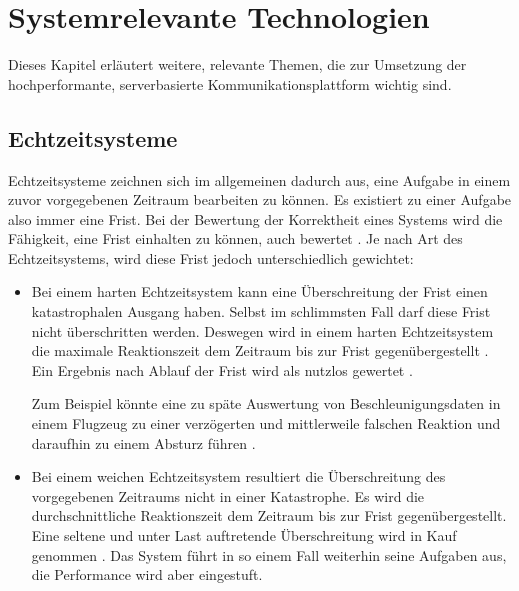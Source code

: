 
\chapter{Systemrelevante Technologien}
\label{com_plattform}

Dieses Kapitel erläutert weitere, relevante Themen, die zur Umsetzung der hochperformante, serverbasierte Kommunikationsplattform wichtig sind.

\section{Echtzeitsysteme}
\label{real_time_systems}
Echtzeitsysteme zeichnen sich im allgemeinen dadurch aus, eine Aufgabe in einem zuvor vorgegebenen Zeitraum bearbeiten zu können.
Es existiert zu einer Aufgabe also immer eine Frist.
Bei der Bewertung der Korrektheit eines Systems wird die Fähigkeit, eine Frist einhalten zu können, auch bewertet \cite[2]{perf:buttazzo2006soft}.
Je nach Art des Echtzeitsystems, wird diese Frist jedoch unterschiedlich gewichtet:

\begin{itemize}
	\item Bei einem harten Echtzeitsystem kann eine Überschreitung der Frist einen katastrophalen Ausgang haben.
	Selbst im schlimmsten Fall darf diese Frist nicht überschritten werden.
	Deswegen wird in einem harten Echtzeitsystem die maximale Reaktionszeit dem Zeitraum bis zur Frist gegenübergestellt \cite[75]{douglass2003real}.
	Ein Ergebnis nach Ablauf der Frist wird als nutzlos gewertet \cite[2]{perf:wang2017real}.
	
	Zum Beispiel könnte eine zu späte Auswertung von Beschleunigungsdaten in einem Flugzeug zu einer verzögerten und mittlerweile falschen Reaktion und daraufhin zu einem Absturz führen \cite[5]{perf:laplante2004real}.
	
	\item Bei einem weichen Echtzeitsystem resultiert die Überschreitung des vorgegebenen Zeitraums nicht in einer Katastrophe.
	Es wird die durchschnittliche Reaktionszeit dem Zeitraum bis zur Frist gegenübergestellt. Eine seltene und unter Last auftretende Überschreitung wird in Kauf genommen \cite[76]{douglass2003real}.
	Das System führt in so einem Fall weiterhin seine Aufgaben aus, die Performance wird aber  eingestuft.
\end{itemize}

